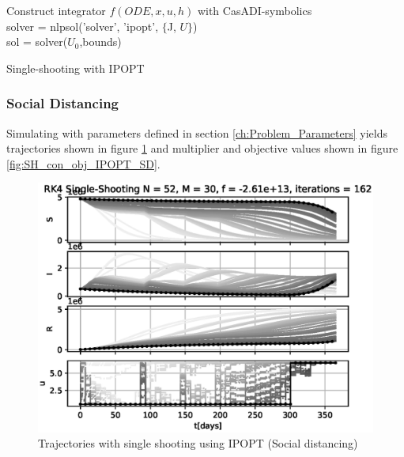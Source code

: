 \begin{algorithm}[H]
\SetAlgoLined
{}
Construct integrator $f(ODE, x, u, h)$ with CasADI-symbolics\\
 solver = nlpsol('solver', 'ipopt', $\{$J, $U\}$)\\
 sol = solver($U_0$,bounds)
 \caption{Single-shooting with IPOPT}
 \label{alg:SingleShooting_Integration_IPOPT}
\end{algorithm}
\subsubsection{Social Distancing}
Simulating with parameters defined in section \ref{ch:Problem_Parameters} yields trajectories shown in figure \ref{fig:SH_Traj_IPOPT_SD} and multiplier and objective values shown in figure \ref{fig:SH_con_obj_IPOPT_SD}.

\begin{figure}[H]
    \centering
    \includegraphics[width=.8\textwidth]{pythonProject/Figures/Single_Shooting_Trajectories_IPOPT_Social_Distancing.eps}
    \caption{Trajectories with single shooting using IPOPT (Social distancing)}
    \label{fig:SH_Traj_IPOPT_SD}
\end{figure}

